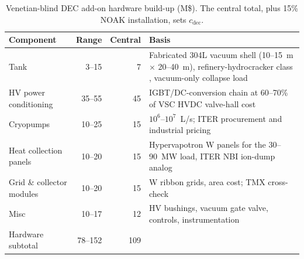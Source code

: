 \documentclass{article}
\begin{document}
\begin{table}[htbp]
\caption{Venetian-blind DEC add-on hardware build-up (M\$). The central
total, plus 15\% NOAK installation, sets $c_{\text{dec}}$.}
\label{tab:dec-buildup}
\centering
\small
\begin{tabular}{lrrp{6.0cm}}
\toprule
Component & Range & Central & Basis \\
\midrule
Tank & 3--15 & 7 & Fabricated 304L vacuum shell (10--15~m $\times$ 20--40~m), refinery-hydrocracker class \citep{exxonmobil_rotterdam_hydrocracker}, vacuum-only collapse load \\
HV power conditioning & 35--55 & 45 & IGBT/DC-conversion chain at 60--70\% of VSC HVDC valve-hall cost \citep{miso2024mtep24} \\
Cryopumps & 10--25 & 15 & $10^6$--$10^7$~L/s; ITER procurement \citep{iter_cryopumps} and industrial pricing \\
Heat collection panels & 10--20 & 15 & Hypervapotron W panels for the 30--90~MW load, ITER NBI ion-dump analog \citep{hemsworth2017} \\
Grid \& collector modules & 10--20 & 15 & W ribbon grids, \citet{hoffman1977} area cost; TMX cross-check \citep{barr_moir1983} \\
Misc & 10--17 & 12 & HV bushings, vacuum gate valve, controls, instrumentation \\
\midrule
Hardware subtotal & 78--152 & 109 & \\
\bottomrule
\end{tabular}
\end{table}
\end{document}
